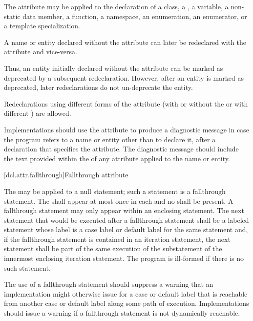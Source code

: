 \pnum
The attribute may be applied to the declaration of
a class,
a ,
a variable,
a non-static data member,
a function,
a namespace,
an enumeration,
an enumerator, or
a template specialization.

\pnum
A name or entity declared without the  attribute can later be redeclared
with the attribute and vice-versa.
\begin{note}
Thus, an entity initially declared without the
attribute can be marked as deprecated by a subsequent redeclaration. However, after an entity
is marked as deprecated, later redeclarations do not un-deprecate the entity.
\end{note}
Redeclarations using different forms of the attribute (with or without the
 or with different
) are allowed.

\pnum
\recommended
Implementations should use the  attribute to produce a diagnostic
message in case the program refers to a name or entity other than to declare it, after a
declaration that specifies the attribute. The diagnostic message should include the text provided
within the  of any  attribute applied
to the name or entity.

[dcl.attr.fallthrough]{Fallthrough attribute}

\pnum
The  
may be applied to a null statement;
such a statement is a fallthrough statement.
The  
shall appear at most once in each  and
no  shall be present.
A fallthrough statement may only appear within
an enclosing  statement.
The next statement that would be executed after a fallthrough statement
shall be a labeled statement whose label is a case label or
default label for the same  statement and,
if the fallthrough statement is contained in an iteration statement,
the next statement shall be part of the same execution of
the substatement of the innermost enclosing iteration statement.
The program is ill-formed if there is no such statement.

\pnum
\recommended
The use of a fallthrough statement should suppress
a warning that an implementation might otherwise issue
for a case or default label that is reachable
from another case or default label along some path of execution.
Implementations should issue a warning
if a fallthrough statement is not dynamically reachable.

